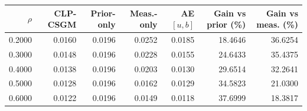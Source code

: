 \begin{tabular}{rrrrrrr}
\toprule
$\rho$ & CLP-CSGM & Prior-only & Meas.-only & AE $[u,b]$ & Gain vs prior (\%) & Gain vs meas. (\%) \\
\midrule
0.2000 & 0.0160 & 0.0196 & 0.0252 & 0.0185 & 18.4646 & 36.6254 \\
0.3000 & 0.0148 & 0.0196 & 0.0228 & 0.0155 & 24.6433 & 35.4375 \\
0.4000 & 0.0138 & 0.0196 & 0.0203 & 0.0130 & 29.6514 & 32.2641 \\
0.5000 & 0.0128 & 0.0196 & 0.0162 & 0.0129 & 34.5823 & 21.0300 \\
0.6000 & 0.0122 & 0.0196 & 0.0149 & 0.0118 & 37.6999 & 18.3817 \\
\bottomrule
\end{tabular}
